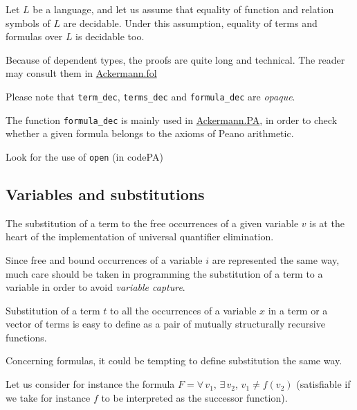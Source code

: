 Let $L$ be a language, and let us assume that equality 
of function and relation symbols of $L$ are decidable.
Under this assumption, equality of terms and formulas over $L$ is decidable too.

Because of dependent types, the proofs are quite long and technical. The reader may consult them in \href{../theories/html/hydras.Ackermann.fol.html}{Ackermann.fol}





\begin{remark}
Please note that \texttt{term\_dec}, \texttt{terms\_dec} and
\texttt{formula\_dec} are \emph{opaque}. 

The function \texttt{formula\_dec} is mainly used in
\href{../theories/html/hydras.Ackermann.PA.html}{Ackermann.PA}, in order to check whether a given formula belongs to the axioms of Peano arithmetic.

\begin{todo}
  Look for the use of \texttt{open}  (in codePA)
\end{todo}

\end{remark}


\subsection{Variables and substitutions}

The substitution of a term to the free occurrences of a given variable $v$ is at the heart of the implementation of universal
quantifier elimination. 

Since free and bound occurrences of a variable $i$ are represented the same way, much care should be taken in programming the substitution of a term to a variable in order to avoid \emph{variable capture}.

Substitution of a term $t$ to all the occurrences of a variable $x$ in a term or a vector of terms is easy to define as a pair of mutually structurally recursive functions.






Concerning formulas, it could be tempting to define substitution the same way.

Let us consider for instance the formula $F = \forall\,v_1, \,\exists\,v_2,\,v_1\not=f(v_2)$ (satisfiable if we take for instance $f$ to be interpreted as the successor function).

